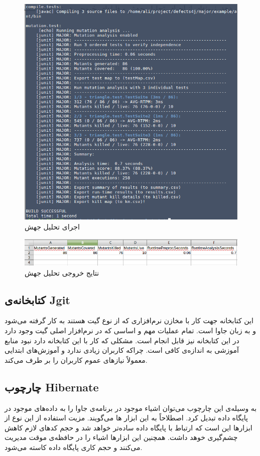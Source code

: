\begin{enumerate}
 \begin{figure}[H]
 	\centering
 	\includegraphics[width=.8\textwidth]{img/case_study/major-analysis.png}
 	\caption{اجرای تحلیل جهش}
 	\label{fig:major-analysis}
 \end{figure}
 
 \begin{figure}[H]
 	\centering
 	\includegraphics[width=.8\textwidth]{img/case_study/major-results.png}
 	\caption{نتایج خروجی تحلیل جهش}
 	\label{fig:major-results}
 \end{figure}

\end{enumerate}


\subsection{کتابخانه‌ی Jgit}
این کتابخانه جهت کار با مخازن نرم‌افزاری  که از نوع گیت هستند به کار گرفته می‌شود و به زبان جاوا است. تمام عملیات مهم و اساسی که در نرم‌افزار اصلی گیت وجود دارد در این کتابخانه نیز قابل انجام است. مشکلی که کار با این کتابخانه دارد نبود منابع آموزشی به اندازه‌ی کافی است. چراکه کاربران زیادی ندارد و آموزش‌های ابتدایی معمولاً نیازهای عموم کاربران را بر طرف می‌کند. 
\subsection{چارچوب Hibernate }
به وسیله‌ی این چارچوب می‌توان  اشیاء موجود در برنامه‌ی جاوا را به داده‌های موجود در پایگاه داده تبدیل کرد. اصطلاحاً به این ابزار ها  می‌گویند. مزیت استفاده از این نوع از ابزارها این است که ارتباط با پایگاه داده ساده‌تر خواهد شد و حجم کدهای لازم کاهش چشم‌گیری خوهد داشت. همچنین این ابزارها اشیاء را در حافظه‌ی موقت مدیریت می‌کنند و حجم کاری پایگاه داده کاسته می‌شود. 